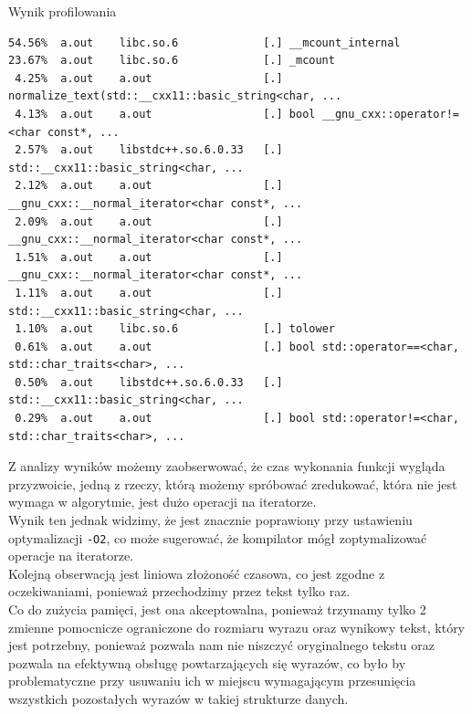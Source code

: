 \documentclass[12pt]{article}
\begin{document}
Wynik profilowania
\begin{verbatim}
54.56%  a.out    libc.so.6             [.] __mcount_internal
23.67%  a.out    libc.so.6             [.] _mcount
 4.25%  a.out    a.out                 [.] normalize_text(std::__cxx11::basic_string<char, ...
 4.13%  a.out    a.out                 [.] bool __gnu_cxx::operator!=<char const*, ...
 2.57%  a.out    libstdc++.so.6.0.33   [.] std::__cxx11::basic_string<char, ...
 2.12%  a.out    a.out                 [.] __gnu_cxx::__normal_iterator<char const*, ...
 2.09%  a.out    a.out                 [.] __gnu_cxx::__normal_iterator<char const*, ...
 1.51%  a.out    a.out                 [.] __gnu_cxx::__normal_iterator<char const*, ...
 1.11%  a.out    a.out                 [.] std::__cxx11::basic_string<char, ...
 1.10%  a.out    libc.so.6             [.] tolower
 0.61%  a.out    a.out                 [.] bool std::operator==<char, std::char_traits<char>, ...
 0.50%  a.out    libstdc++.so.6.0.33   [.] std::__cxx11::basic_string<char, ...
 0.29%  a.out    a.out                 [.] bool std::operator!=<char, std::char_traits<char>, ...
\end{verbatim}

Z analizy wyników możemy zaobserwować, że czas wykonania funkcji wygląda przyzwoicie,
jedną z rzeczy, którą możemy spróbować zredukować, która nie jest wymaga w algorytmie, 
jest dużo operacji na iteratorze. \\

Wynik ten jednak widzimy, że jest znacznie poprawiony przy ustawieniu optymalizacji
\verb|-O2|, co może sugerować, że kompilator mógł zoptymalizować operacje na iteratorze. \\

Kolejną obserwacją jest liniowa złożoność czasowa, co jest zgodne z oczekiwaniami, ponieważ
przechodzimy przez tekst tylko raz. \\

Co do zużycia pamięci, jest ona akceptowalna, ponieważ trzymamy tylko 2 zmienne pomocnicze
ograniczone do rozmiaru wyrazu oraz wynikowy tekst, który jest potrzebny, ponieważ pozwala
nam nie niszczyć oryginalnego tekstu oraz pozwala na efektywną obsługę powtarzających się 
wyrazów, co było by problematyczne przy usuwaniu ich w miejscu wymagającym przesunięcia
wszystkich pozostałych wyrazów w takiej strukturze danych. \\
\end{document}

